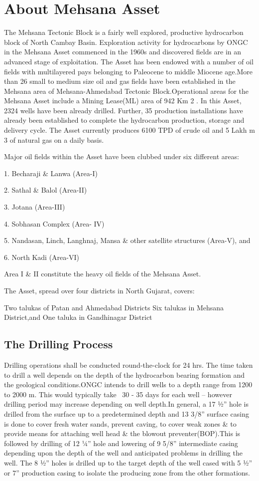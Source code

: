 \section{About Mehsana Asset}

The Mehsana Tectonic Block is a fairly well explored, productive hydrocarbon block of North Cambay Basin. Exploration activity for hydrocarbons by ONGC in the Mehsana Asset commenced in the 1960s and discovered fields are in an advanced stage of exploitation. The Asset has been endowed with a number of oil fields with multilayered pays belonging to Paleocene to middle Miocene age.More than 26 small to medium size oil and gas fields have been established in the Mehsana area of Mehsana-Ahmedabad Tectonic Block.Operational areas for the Mehsana Asset include a Mining Lease(ML) area of 942 Km 2 . In this Asset, 2324 wells have been already
drilled. Further, 35 production installations have already been established to complete the hydrocarbon production, storage and delivery cycle. The Asset currently produces 6100 TPD of crude oil and 5 Lakh m 3 of natural gas on a daily basis.

Major oil fields within the Asset have been clubbed under six different areas:

1. Becharaji \& Lanwa (Area-I)

2. Sathal \& Balol (Area-II)

3. Jotana (Area-III)

4. Sobhasan Complex (Area- IV)

5. Nandasan, Linch, Langhnaj, Mansa \& other satellite structures (Area-V), and

6. North Kadi (Area-VI)

Area I \& II constitute the heavy oil fields of the Mehsana Asset.

The Asset, spread over four districts in North Gujarat, covers:

Two talukas of Patan and Ahmedabad Districts Six talukas in Mehsana District,and One taluka in Gandhinagar District

\subsection{\textbf{The Drilling Process}}

Drilling operations shall be conducted round-the-clock for 24 hrs. The time taken to drill a well depends on the depth of the hydrocarbon bearing formation and the geological conditions.ONGC intends to drill wells to a depth range from 1200 to 2000 m. This would typically take ~30 - 35 days for each well – however drilling period may increase depending on well depth.In general, a 17 1⁄2” hole is drilled from the surface up to a predetermined depth and 13 3/8” surface casing is done to cover fresh water sands, prevent caving, to cover weak zones \& to provide means for attaching well head \& the blowout preventer(BOP).This is followed by drilling of 12 1⁄4” hole and lowering of 9 5/8” intermediate casing depending upon the depth of the well and anticipated problems in drilling the well. The 8 1⁄2” holes is drilled up to the target depth of the well cased with 5 1⁄2” or 7” production casing to isolate the producing zone from the other formations.

